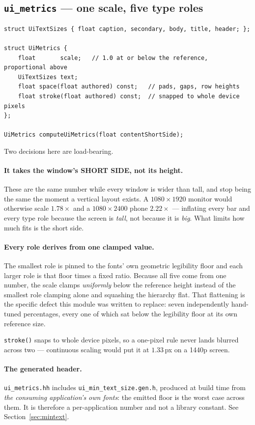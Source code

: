 \documentclass[11pt,a4paper]{article}
\begin{document}
\subsection{\texttt{ui\_metrics} --- one scale, five type roles}

\begin{lstlisting}
struct UiTextSizes { float caption, secondary, body, title, header; };

struct UiMetrics {
    float       scale;   // 1.0 at or below the reference, proportional above
    UiTextSizes text;
    float space(float authored) const;   // pads, gaps, row heights
    float stroke(float authored) const;  // snapped to whole device pixels
};

UiMetrics computeUiMetrics(float contentShortSide);
\end{lstlisting}

Two decisions here are load-bearing.

\paragraph{It takes the window's SHORT SIDE, not its height.} These are the same
number while every window is wider than tall, and stop being the same the moment
a vertical layout exists. A $1080\times1920$ monitor would otherwise scale
$1.78\times$ and a $1080\times2400$ phone $2.22\times$ --- inflating every bar
and every type role because the screen is \emph{tall}, not because it is
\emph{big}. What limits how much fits is the short side.

\paragraph{Every role derives from one clamped value.} The smallest role is
pinned to the fonts' own geometric legibility floor and each larger role is that
floor times a fixed ratio. Because all five come from one number, the scale
clamps \emph{uniformly} below the reference height instead of the smallest role
clamping alone and squashing the hierarchy flat. That flattening is the specific
defect this module was written to replace: seven independently hand-tuned
percentages, every one of which sat below the legibility floor at its own
reference size.

\texttt{stroke()} snaps to whole device pixels, so a one-pixel rule never lands
blurred across two --- continuous scaling would put it at $1.33$\,px on a 1440p
screen.

\paragraph{The generated header.} \texttt{ui\_metrics.hh} includes
\texttt{ui\_min\_text\_size.gen.h}, produced at build time from \emph{the
consuming application's own fonts}: the emitted floor is the worst case across
them. It is therefore a per-application number and not a library constant. See
Section~\ref{sec:mintext}.
\end{document}
